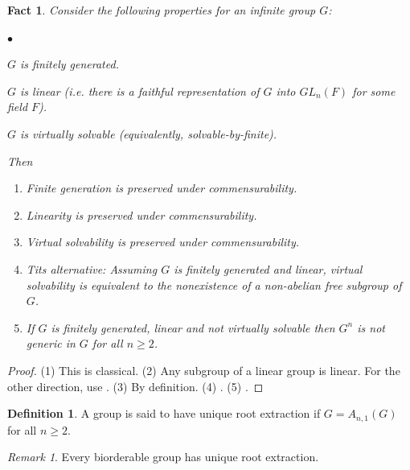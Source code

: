 \documentclass[11pt]{amsart}
\theoremstyle{plain}
\newtheorem{fact}[theorem]{Fact}
\theoremstyle{definition}
\newtheorem{definition}[theorem]{Definition}
\theoremstyle{remark}
\newtheorem{remark}[theorem]{Remark}
\numberwithin{equation}{section}
\begin{document}
\begin{fact}\label{F:important facts}
    Consider the following properties for an infinite group $G$:
    \begin{list}{$\bullet$}{}
        \item $G$ is finitely generated.
        \item $G$ is linear (i.e. there is a faithful representation of $G$ into $GL_n(F)$ for some field $F$).
        \item $G$ is virtually solvable (equivalently, solvable-by-finite).
    \end{list}
    Then
    \begin{enumerate}
        \item Finite generation is preserved under commensurability.  
        \item Linearity is preserved under commensurability.
        \item Virtual solvability is preserved under commensurability.
        \item Tits alternative: Assuming $G$ is finitely generated and linear, virtual solvability is equivalent to the nonexistence of a non-abelian free subgroup of $G$.
        \item If $G$ is finitely generated, linear and not virtually solvable then $G^n$ is not generic in $G$ for all $n\geq 2$.
    \end{enumerate}
\end{fact}
\begin{proof}
    (1) This is classical. 
    (2) Any subgroup of a linear group is linear. For the other direction, use \cite[Lemma 2.3]{We:lineargroups}.
    (3) By definition.
    (4) \cite{Ti:alternative}.
    (5) \cite[Theorem B]{HrKrLuSh:Powers}.
\end{proof}

\begin{definition}
    A group is said to have unique root extraction if  $G=A_{n,1}(G)$ for all $n\geq 2$.
\end{definition}
\begin{remark}
    Every biorderable group has unique root extraction.
\end{remark}
\end{document}
